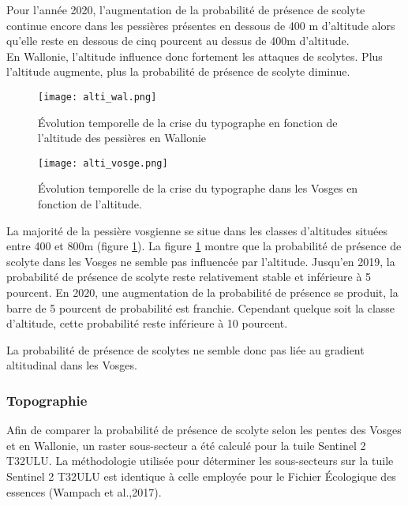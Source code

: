 Pour l'année 2020, l'augmentation de la probabilité de présence de scolyte continue encore dans les pessières présentes en dessous de 400 m d'altitude alors qu'elle reste en dessous de cinq pourcent au dessus de 400m d'altitude.\\

En Wallonie, l'altitude influence donc fortement les attaques de scolytes. Plus l'altitude augmente, plus la probabilité de présence de scolyte diminue. \\

\begin{figure}[htbp]
	\begin{minipage}[b]{1 \linewidth}
		\centering
		\texttt{[image: alti\_wal.png]}
		\caption{Évolution temporelle de la crise du typographe en fonction de l'altitude des pessières en Wallonie }
		\label{fig: alti_rw}
		
	\end{minipage}\hfill
	\vspace{0.75cm}
	\begin{minipage}[b]{1 \linewidth}
		\centering
		\texttt{[image: alti\_vosge.png]}
		\caption{Évolution temporelle de la crise du typographe dans les Vosges en fonction de l'altitude.}
		\label{fig: alti_vosges}
	\end{minipage}
\end{figure}




La majorité de la pessière vosgienne se situe dans les classes d'altitudes situées entre 400 et 800m (figure \ref{fig: alti_vosges}).
La figure \ref{fig: alti_vosges} montre que la probabilité de présence de scolyte dans les Vosges ne semble pas influencée par l'altitude. Jusqu'en 2019, la probabilité de présence de scolyte reste relativement stable et inférieure à 5 pourcent. En 2020, une augmentation de la probabilité de présence se produit, la barre de 5 pourcent de probabilité est franchie. Cependant quelque soit la classe d'altitude, cette probabilité reste inférieure à 10 pourcent.


La probabilité de présence de scolytes ne semble donc pas liée au gradient altitudinal dans les Vosges.


\subsubsection{Topographie}
Afin de comparer la probabilité de présence de scolyte selon les pentes des Vosges et en Wallonie, un raster sous-secteur a été calculé pour la tuile Sentinel 2 T32ULU. La méthodologie utilisée pour déterminer les sous-secteurs sur la tuile Sentinel 2 T32ULU est identique à celle employée pour le Fichier Écologique des essences (Wampach et al.,2017).

